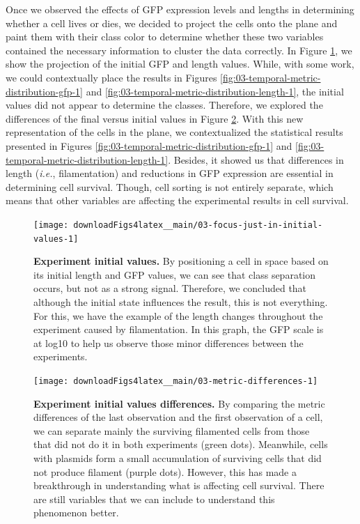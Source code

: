 \documentclass[a4paper, nobind]{templates/ociamthesis}
\begin{document}
Once we observed the effects of GFP expression levels and lengths in determining whether a cell lives or dies, we decided to project the cells onto the plane and paint them with their class color to determine whether these two variables contained the necessary information to cluster the data correctly.
In Figure \ref{fig:03-focus-just-in-initial-values-1}, we show the projection of the initial GFP and length values.
While, with some work, we could contextually place the results in Figures \ref{fig:03-temporal-metric-distribution-gfp-1} and \ref{fig:03-temporal-metric-distribution-length-1}, the initial values did not appear to determine the classes.
Therefore, we explored the differences of the final versus initial values in Figure \ref{fig:03-metric-differences-1}.
With this new representation of the cells in the plane, we contextualized the statistical results presented in Figures \ref{fig:03-temporal-metric-distribution-gfp-1} and \ref{fig:03-temporal-metric-distribution-length-1}.
Besides, it showed us that differences in length (\emph{i.e.}, filamentation) and reductions in GFP expression are essential in determining cell survival.
Though, cell sorting is not entirely separate, which means that other variables are affecting the experimental results in cell survival.





\begin{figure}[H]
\texttt{[image: downloadFigs4latex\_\_main/03-focus-just-in-initial-values-1]} \caption[Experiment initial values.]{\textbf{Experiment initial values.} By positioning a cell in space based on its initial length and GFP values, we can see that class separation occurs, but not as a strong signal. Therefore, we concluded that although the initial state influences the result, this is not everything. For this, we have the example of the length changes throughout the experiment caused by filamentation. In this graph, the GFP scale is at log10 to help us observe those minor differences between the experiments.}\label{fig:03-focus-just-in-initial-values-1}
\end{figure}





\begin{figure}[H]
\texttt{[image: downloadFigs4latex\_\_main/03-metric-differences-1]} \caption[Experiment initial values differences.]{\textbf{Experiment initial values differences.} By comparing the metric differences of the last observation and the first observation of a cell, we can separate mainly the surviving filamented cells from those that did not do it in both experiments (green dots). Meanwhile, cells with plasmids form a small accumulation of surviving cells that did not produce filament (purple dots). However, this has made a breakthrough in understanding what is affecting cell survival. There are still variables that we can include to understand this phenomenon better.}\label{fig:03-metric-differences-1}
\end{figure}
\end{document}

